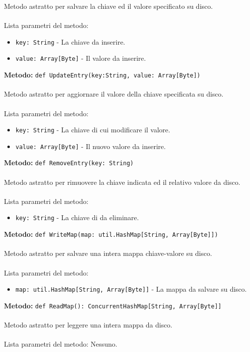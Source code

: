 \documentclass[a4paper]{article}
\begin{document}
		Metodo astratto per salvare la chiave ed il valore specificato su disco.
		\\ \\
		Lista parametri del metodo:
		\begin{itemize}
			\item \texttt{key: String} - La chiave da inserire.
			\item \texttt{value: Array[Byte]} - Il valore da inserire.
		\end{itemize}
		\textbf{Metodo:} \texttt{def UpdateEntry(key:String, value: Array[Byte])}
		\\ \\
		Metodo astratto per aggiornare il valore della chiave specificata su disco.
		\\ \\
		Lista parametri del metodo:
		\begin{itemize}
			\item \texttt{key: String} - La chiave di cui modificare il valore.
			\item \texttt{value: Array[Byte]} - Il nuovo valore da inserire.
		\end{itemize}
		\textbf{Metodo:} \texttt{def RemoveEntry(key: String)}
		\\ \\
		Metodo astratto per rimuovere la chiave indicata ed il relativo valore da disco.
		\\ \\
		Lista parametri del metodo:
		\begin{itemize}
			\item \texttt{key: String} - La chiave di da eliminare.
		\end{itemize}
		\textbf{Metodo:} \texttt{def WriteMap(map: util.HashMap[String, Array[Byte]])}
		\\ \\
		Metodo astratto per salvare una intera mappa chiave-valore su disco.
		\\ \\
		Lista parametri del metodo:
		\begin{itemize}
			\item \texttt{map: util.HashMap[String, Array[Byte]]} - La mappa da salvare su disco.
		\end{itemize}
		\textbf{Metodo:} \texttt{def ReadMap():  ConcurrentHashMap[String, Array[Byte]]}
		\\ \\
		Metodo astratto per leggere una intera mappa da disco.
		\\ \\
		Lista parametri del metodo: Nessuno.	
		
\end{document}
